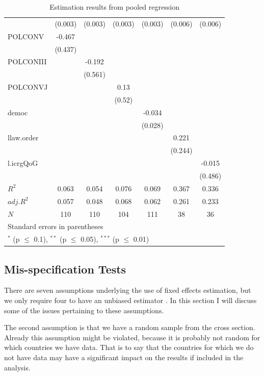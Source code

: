 \documentclass{article}\usepackage{graphicx, color}
\begin{document}
\begin{table}
\begin{tabular}{l*{6}{c}}
  		&(0.003) 		&(0.003) 		&(0.003) 		&(0.003) 		&(0.006) 		&(0.006) \\
POLCONV 		&-0.467 		& 		& 		& 		& 		& \\
  		&(0.437) 		& 		& 		& 		& 		& \\
POLCONIII 		& 		&-0.192 		& 		& 		& 		& \\
  		& 		&(0.561) 		& 		& 		& 		& \\
POLCONVJ 		& 		& 		&0.13 		& 		& 		& \\
  		& 		& 		&(0.52) 		& 		& 		& \\
democ 		& 		& 		& 		&-0.034 		& 		& \\
  		& 		& 		& 		&(0.028) 		& 		& \\
llaw.order 		& 		& 		& 		& 		&0.221 		& \\
  		& 		& 		& 		& 		&(0.244) 		& \\
l.icrgQoG 		& 		& 		& 		& 		& 		&-0.015 \\
  		& 		& 		& 		& 		& 		&(0.486) \\
\hline
$R^2$ 		&0.063 		&0.054 		&0.076 		&0.069 		&0.367 		&0.336 \\
$adj.R^2$ 		&0.057 		&0.048 		&0.068 		&0.062 		&0.261 		&0.233 \\
$N$ 		&\multicolumn{1}{c}{110} 		&\multicolumn{1}{c}{110} 		&\multicolumn{1}{c}{104} 		&\multicolumn{1}{c}{111} 		&\multicolumn{1}{c}{38} 		&\multicolumn{1}{c}{36} \\
\hline\hline
\multicolumn{7}{l}{\footnotesize Standard errors in parentheses}\\
\multicolumn{7}{l}{\footnotesize $^{*}$ (p $\le$ 0.1), $^{**}$ (p $\le$ 0.05), $^{***}$ (p $\le$ 0.01)}\\
\end{tabular}
\caption{Estimation results from pooled regression}
\label{tab:fe6}
\end{table}




\subsection{Mis-specification Tests}

There are seven assumptions underlying the use of fixed effects estimation,
but we only require four to have an unbiased estimator \citep[pp. 503-4]{wooldridge2009introductory2}.
In this section I will discuss some of the issues pertaining to these
assumptions.

The second assumption is that we have a random sample from the cross
section. Already this assumption might be violated, because it is
probably not random for which countries we have data. That is to say
that the countries for which we do not have data may have a significant
impact on the results if included in the analysis.
\end{document}
